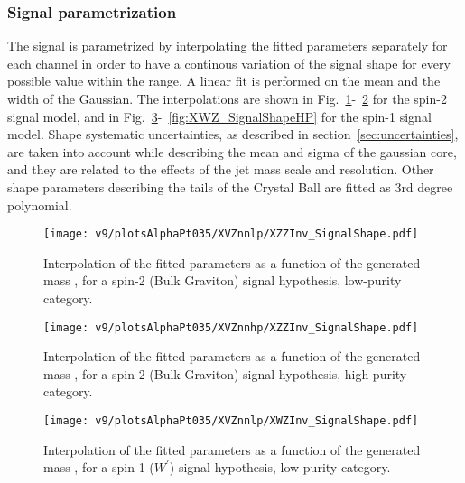 \clearpage

\subsubsection{Signal parametrization}

The signal is parametrized by interpolating the fitted parameters separately for each channel in order to have a continous variation of the signal shape for every possible \mX value within the range. A linear fit is performed on the mean and the width of the Gaussian. The interpolations are shown in Fig.~\ref{fig:XZZ_SignalShapeLP}-~\ref{fig:XZZ_SignalShapeHP} for the spin-2 signal model, and in Fig.~\ref{fig:XWZ_SignalShapeLP}-~\ref{fig:XWZ_SignalShapeHP} for the spin-1 signal model. Shape systematic uncertainties, as described in section~\ref{sec:uncertainties}, are taken into account while describing the mean and sigma of the gaussian core, and they are related to the effects of the jet mass scale and resolution. Other shape parameters describing the tails of the Crystal Ball are fitted as 3rd degree polynomial.


\begin{figure}[!htb]
  \centering
    \texttt{[image: v9/plotsAlphaPt035/XVZnnlp/XZZInv\_SignalShape.pdf]}
  \caption{Interpolation of the fitted parameters as a function of the generated mass \mtVZ, for a spin-2 (Bulk Graviton) signal hypothesis, low-purity category.}
  \label{fig:XZZ_SignalShapeLP}
\end{figure}

\begin{figure}[!htb]
  \centering
    \texttt{[image: v9/plotsAlphaPt035/XVZnnhp/XZZInv\_SignalShape.pdf]}

  \caption{Interpolation of the fitted parameters as a function of the generated mass \mtVZ, for a spin-2 (Bulk Graviton) signal hypothesis, high-purity category.}
  \label{fig:XZZ_SignalShapeHP}
\end{figure}

\begin{figure}[!htb]
  \centering
    \texttt{[image: v9/plotsAlphaPt035/XVZnnlp/XWZInv\_SignalShape.pdf]}
  \caption{Interpolation of the fitted parameters as a function of the generated mass \mtVZ, for a spin-1 ($W^{'}$) signal hypothesis, low-purity category.}
  \label{fig:XWZ_SignalShapeLP}
\end{figure}

